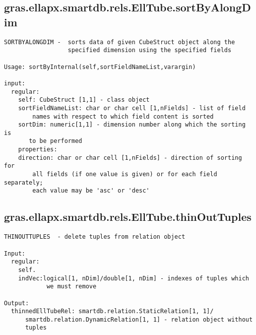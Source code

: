 \subsection{\texorpdfstring{gras.ellapx.smartdb.rels.EllTube.sortByAlongDim}{sortByAlongDim}}\label{method:gras.ellapx.smartdb.rels.EllTube.sortByAlongDim}
\begin{verbatim}
SORTBYALONGDIM -  sorts data of given CubeStruct object along the
                  specified dimension using the specified fields

Usage: sortByInternal(self,sortFieldNameList,varargin)

input:
  regular:
    self: CubeStruct [1,1] - class object
    sortFieldNameList: char or char cell [1,nFields] - list of field
        names with respect to which field content is sorted
    sortDim: numeric[1,1] - dimension number along which the sorting is
       to be performed
    properties:
    direction: char or char cell [1,nFields] - direction of sorting for
        all fields (if one value is given) or for each field separately;
        each value may be 'asc' or 'desc'
\end{verbatim}
\subsection{\texorpdfstring{gras.ellapx.smartdb.rels.EllTube.thinOutTuples}{thinOutTuples}}\label{method:gras.ellapx.smartdb.rels.EllTube.thinOutTuples}
\begin{verbatim}
THINOUTTUPLES  - delete tuples from relation object

Input:
  regular:
    self.
    indVec:logical[1, nDim]/double[1, nDim] - indexes of tuples which
            we must remove

Output:
  thinnedEllTubeRel: smartdb.relation.StaticRelation[1, 1]/
      smartdb.relation.DynamicRelation[1, 1] - relation object without
      tuples
\end{verbatim}
